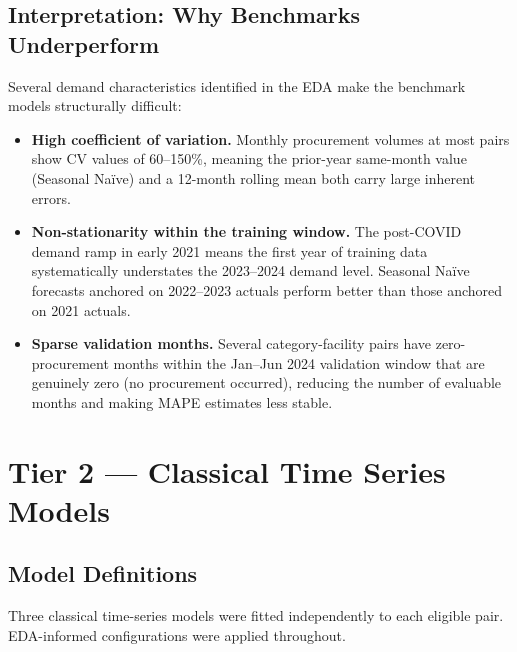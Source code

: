 \documentclass[12pt, a4paper]{article}
\begin{document}
\subsection{Interpretation: Why Benchmarks Underperform}

Several demand characteristics identified in the EDA make the benchmark
models structurally difficult:

\begin{itemize}[leftmargin=1.5em, itemsep=4pt]
  \item \textbf{High coefficient of variation.} Monthly procurement
        volumes at most pairs show CV values of 60--150\%, meaning
        the prior-year same-month value (Seasonal Na\"{i}ve) and a
        12-month rolling mean both carry large inherent errors.

  \item \textbf{Non-stationarity within the training window.}
        The post-COVID demand ramp in early 2021 means the first year of
        training data systematically understates the 2023--2024 demand
        level. Seasonal Na\"{i}ve forecasts anchored on 2022--2023
        actuals perform better than those anchored on 2021 actuals.

  \item \textbf{Sparse validation months.}
        Several category-facility pairs have zero-procurement months
        within the Jan--Jun 2024 validation window that are genuinely
        zero (no procurement occurred), reducing the number of evaluable
        months and making MAPE estimates less stable.
\end{itemize}

\section{Tier 2 --- Classical Time Series Models}

\subsection{Model Definitions}

Three classical time-series models were fitted independently to each
eligible pair. EDA-informed configurations were applied throughout.
\end{document}
